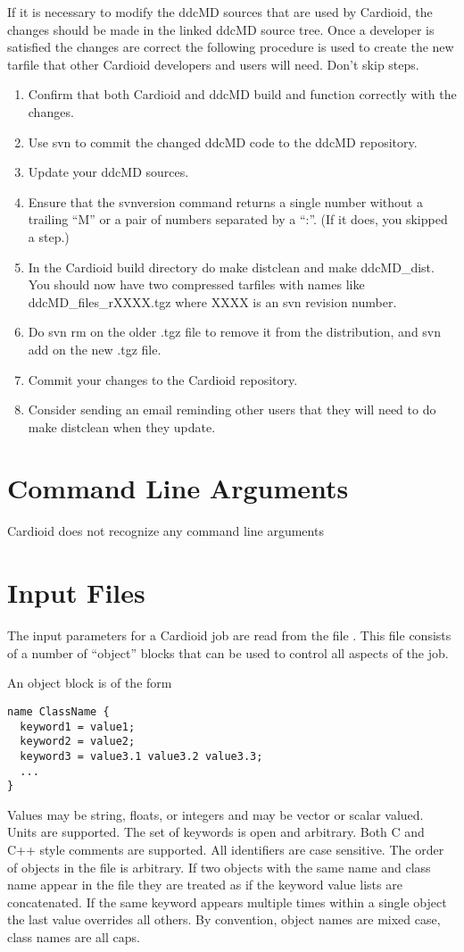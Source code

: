 \documentclass{article}
\begin{document}
If it is necessary to modify the ddcMD sources that are used by
Cardioid, the changes should be made in the linked ddcMD source tree.
Once a developer is satisfied the changes are correct the following
procedure is used to create the new tarfile that other Cardioid
developers and users will need.  Don't skip steps.
\begin{enumerate}
\item Confirm that both Cardioid and ddcMD build and function correctly
  with the changes.
\item Use svn to commit the changed ddcMD code to the ddcMD repository.
\item Update your ddcMD sources.  
\item Ensure that the svnversion command returns a single number without
  a trailing ``M'' or a pair of numbers separated by a ``:''.  (If it
  does, you skipped a step.)
\item In the Cardioid build directory do make distclean and make
  ddcMD\_dist.  You should now have two compressed tarfiles with names
  like ddcMD\_files\_rXXXX.tgz where XXXX is an svn revision number.
\item Do svn rm on the older .tgz file to remove it from the
  distribution, and svn add on the new .tgz file.  
\item Commit your changes to the Cardioid repository.
\item Consider sending an email reminding other users that they will
  need to do make distclean when they update.
\end{enumerate}

\section{Command Line Arguments}

Cardioid does not recognize any command line arguments

\section{Input Files}

The input parameters for a Cardioid job are read from the file
.  This file consists of a number of ``object'' blocks
that can be used to control all aspects of the job.

An object block is of the form
\begin{verbatim}
name ClassName { 
  keyword1 = value1; 
  keyword2 = value2;
  keyword3 = value3.1 value3.2 value3.3;
  ...
}
\end{verbatim}
Values may be string, floats, or integers and may be vector or scalar
valued.  Units are supported.  The set of keywords is open and
arbitrary.  Both C and C++ style comments are supported.  All
identifiers are case sensitive.  The order of objects in the file is
arbitrary.  If two objects with the same name and class name appear in
the file they are treated as if the keyword value lists are
concatenated.  If the same keyword appears multiple times within a
single object the last value overrides all others.  By convention,
object names are mixed case, class names are all caps.
\end{document}
